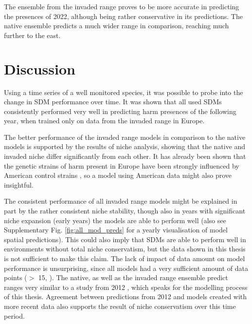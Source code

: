 \documentclass[12pt,a4paper]{article}
\begin{document}
The ensemble from the invaded range proves to be more accurate in predicting the presences of 2022, although being rather conservative in its predictions. The native ensemble predicts a much wider range in comparison, reaching much further to the east.


\newpage
\section{Discussion} \label{sec:discussion}
Using a time series of a well monitored species, it was possible to probe into the change in SDM performance over time.
It was shown that all used SDMs consistently performed very well in predicting \gls{harm} presences of the following year, when trained only on data from the invaded range in Europe.

The better performance of the invaded range models in comparison to the native models is supported by the results of niche analysis, showing that the native and invaded niche differ significantly from each other.
It has already been shown that the genetic strains of \gls{harm} present in Europe have been strongly influenced by American control strains \autocite{lombaert2010harmoniabridgehead}, so a model using American data might also prove insightful.

The consistent performance of all invaded range models might be explained in part by the rather consistent niche stability, though also in years with significant niche expansion (early years) the models are able to perform well (also see Supplementary Fig. \ref{fig:all_mod_preds} for a yearly visualisation of model spatial predictions).
This could also imply that SDMs are able to perform well in environments without total niche conservatism, but the data shown in this thesis is not sufficient to make this claim.
The lack of impact of data amount on model performance is unsurprising, since all models had a very sufficient amount of data points ($>$ 15, \autocite{stoa2019SDMdata}).
The native, as well as the invaded range ensemble predict ranges very similar to a study from 2012 \autocite{bidinger2012harmSDMglobalMaxent}, which speaks for the modelling process of this thesis.
Agreement between predictions from 2012 and models created with more recent data also supports the result of niche conservatism over this time period.
\end{document}
